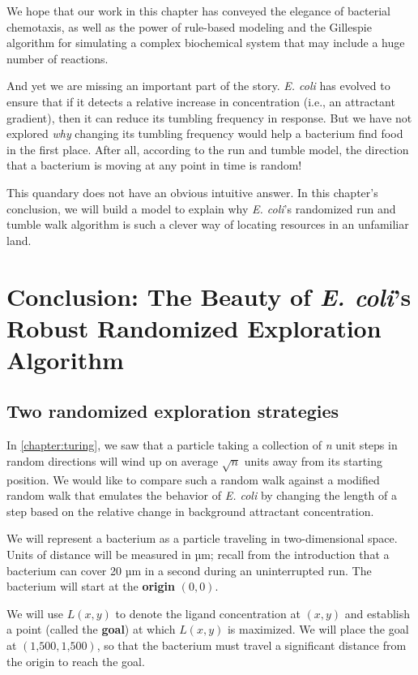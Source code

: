 We hope that our work in this chapter has conveyed the elegance of bacterial chemotaxis, as well as the power of rule-based modeling and the Gillespie algorithm for simulating a complex biochemical system that may include a huge number of reactions.

And yet we are missing an important part of the story. \textit{E. coli} has evolved to ensure that if it detects a relative increase in concentration (i.e., an attractant gradient), then it can reduce its tumbling frequency in response. But we have not explored \textit{why} changing its tumbling frequency would help a bacterium find food in the first place. After all, according to the run and tumble model, the direction that a bacterium is moving at any point in time is random!

This quandary does not have an obvious intuitive answer. In this chapter's conclusion, we will build a model to explain why \textit{E. coli}'s randomized run and tumble walk algorithm is such a clever way of locating resources in an unfamiliar land.\\


\FloatBarrier
{}

\section{Conclusion: The Beauty of \textit{E. coli}'s Robust Randomized Exploration Algorithm}
\label{sec:conclusion}

\subsection{Two randomized exploration strategies}

In \autoref{chapter:turing}, we saw that a particle taking a collection of \textit{n} unit steps in random directions will wind up on average $\sqrt{n}$ units away from its starting position. We would like to compare such a random walk against a modified random walk that emulates the behavior of \textit{E. coli} by changing the length of a step based on the relative change in background attractant concentration.

We will represent a bacterium as a particle traveling in two-dimensional space. Units of distance will be measured in µm; recall from the introduction that a bacterium can cover 20 µm in a second during an uninterrupted run. The bacterium will start at the \textbf{origin} $(0, 0)$.

We will use $L(x,y)$ to denote the ligand concentration at $(x, y)$ and establish a point (called the \textbf{goal}) at which $L(x,y)$ is maximized. We will place the goal at $(\text{1,500}, \text{1,500})$, so that the bacterium must travel a significant distance from the origin to reach the goal.

